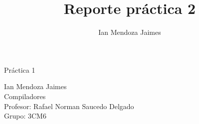 \documentclass[12pt]{article}
\title{Reporte práctica 2}
\author{Ian Mendoza Jaimes}
\date{}
\begin{document}
\begin{titlepage}
\centering
	\vspace*{1.5in}
	\begin{huge}
		Práctica 1\\
	\end{huge}
	\vspace{4em}
	\begin{Large}
		Ian Mendoza Jaimes \\
		\vspace{4em}
		Compiladores \\
		\vspace{1em}
		Profesor: Rafael Norman Saucedo Delgado \\
		\vspace{1em}
		Grupo: 3CM6 \\
		\vspace{1em}
	\end{Large}
\end{titlepage}

\tableofcontents
{}
\pagebreak



\newpage



\newpage



\newpage



\vspace{3em}



\end{document}
